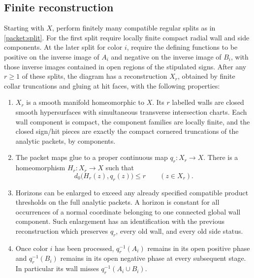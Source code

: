 \subsection{Finite reconstruction}

\begin{proposition}\label{packet:reconstruction}
Starting with $X$, perform finitely many compatible regular splits as
in \cref{packet:split}.  For the first split require locally finite
compact radial wall and side components.  At the later split for
color $i$, require the defining functions to be positive on the inverse
image of $A_i$ and negative on the inverse image of $B_i$, with those
inverse images contained in open regions of the stipulated signs.
After any $r\ge1$ of these splits, the diagram has a reconstruction
$X_r$, obtained by finite collar truncations and gluing at hit faces,
with the following properties:
\begin{enumerate}[label=(\roman*),leftmargin=*]
\item $X_r$ is a smooth manifold homeomorphic to $X$.  Its $r$ labelled
walls are closed smooth hypersurfaces with simultaneous transverse
intersection charts.  Each wall component is compact, the component
families are locally finite, and the closed sign/hit pieces are exactly
the compact cornered truncations of the analytic packets, by components.
\item The packet maps glue to a proper continuous map $q_r:X_r\to X$.
There is a homeomorphism $H_r:X_r\to X$ such that
\begin{equation}\label{packet:displacement}
 d_0\bigl(H_r(z),q_r(z)\bigr)\le r\qquad(z\in X_r).
\end{equation}
\item Horizons can be enlarged to exceed any already specified
compatible product thresholds on the full analytic packets.  A horizon
is constant for all occurrences of a normal coordinate belonging to
one connected global wall component.  Such enlargement has an
identification with the previous reconstruction which preserves
$q_r$, every old wall, and every old side status.
\item Once color $i$ has been processed, $q_r^{-1}(A_i)$ remains in its
open positive phase and $q_r^{-1}(B_i)$ remains in its open negative
phase at every subsequent stage.  In particular its wall misses
$q_r^{-1}(A_i\cup B_i)$.
\end{enumerate}
\end{proposition}

